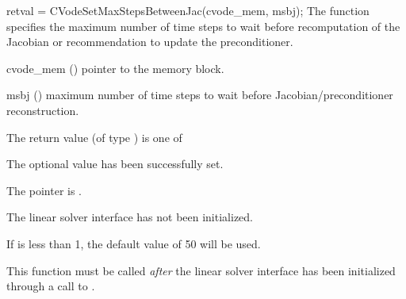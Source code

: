 {
  retval = CVodeSetMaxStepsBetweenJac(cvode\_mem, msbj);
}
{
  The function  specifies the maximum
  number of time steps to wait before recomputation of the Jacobian or
  recommendation to update the preconditioner.
}
{
  \begin{args}
  \item[cvode\_mem] ()
    pointer to the {\cvodes} memory block.
  \item[msbj] ()
    maximum number of time steps to wait before
    Jacobian/preconditioner reconstruction.
  \end{args}
}
{
  The return value  (of type ) is one of
  \begin{args}
  \item[\Id{CVLS\_SUCCESS}]
    The optional value has been successfully set.
  \item[\Id{CVLS\_MEM\_NULL}]
    The  pointer is .
  \item[\Id{CVLS\_LMEM\_NULL}]
    The {\cvls} linear solver interface has not been initialized.
  \end{args}
}
{
  If  is less than 1, the default value of 50 will be used.

  This function must be called \emph{after} the {\cvls} linear solver
  interface has been initialized through a call to
  .
}


